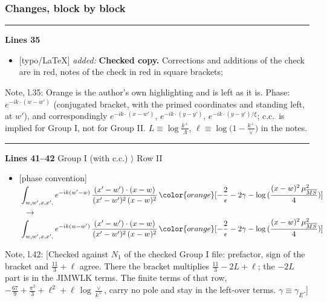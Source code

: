 \documentclass[10pt]{article}
\newenvironment{notebox}{\def\FrameCommand{{\color{notebar}\vrule width 1.5pt}\hspace{6pt}}\MakeFramed{\advance\hsize-\width\FrameRestore}\small}{\endMakeFramed}
\begin{document}
\subsubsection*{Changes, block by block}
\noindent\rule{\linewidth}{0.3pt}\par\noindent\textbf{Lines 35}\par
\begin{itemize}[leftmargin=2.2em,itemsep=1pt,topsep=2pt]
\item[\textbf{l.35}] \textsf{\small [typo/LaTeX]} \emph{added:} \textbf{Checked copy.} Corrections and additions of the check are in red, notes of the check in red in square brackets;
\end{itemize}
\begin{notebox}\textsf{\small Note, l.35:} Orange is the author's own highlighting and is left as it is. Phase: $e^{-ik\cdot(w-w')}$ (conjugated bracket, with the primed coordinates and standing left, at $w'$), and correspondingly $e^{-ik\cdot(x-w')}$, $e^{-ik\cdot(y-y')}$, $e^{-ik\cdot(y-y')/\xi}$; c.c.\ is implied for Group I, not for Group II. $L\equiv\log\frac{k^{+}}{\Lambda}$, $\ell\equiv\log\big(1-\frac{k^{+}}{\vee}\big)$ in the notes.\end{notebox}
\noindent\rule{\linewidth}{0.3pt}\par\noindent\textbf{Lines 41--42} \quad \textsf{Group I (with c.c.) $\rangle$ Row II} \par
\begin{itemize}[leftmargin=2.2em,itemsep=1pt,topsep=2pt]
\item[\textbf{l.41}] \textsf{\small [phase convention]} $\displaystyle \, \int_{w, w',x,x',} e^{-ik(w^\prime-w)}\, \frac{(x'-w')\cdot (x-w)}{(x'-w')^{2}\, (x-w)^{2}}\, {\color{orange}[-\frac{2}{\epsilon}-2\gamma-\log{(\frac{(x-w)^{2}\,\mu^{2}_{\overline{MS}}}{4})}]}$\ $\longrightarrow$\ $\displaystyle \, \int_{w, w',x,x',} e^{-ik(w-w^\prime)}\, \frac{(x'-w')\cdot (x-w)}{(x'-w')^{2}\, (x-w)^{2}}\, {\color{orange}[-\frac{2}{\epsilon}-2\gamma-\log{(\frac{(x-w)^{2}\,\mu^{2}_{\overline{MS}}}{4})}]}$
\end{itemize}
\begin{notebox}\textsf{\small Note, l.42:} [Checked against $N_{1}$ of the checked Group I file: prefactor, sign of the bracket and $\frac{11}{3}+\ell$ agree. There the bracket multiplies $\frac{11}{3}-2L+\ell$; the $-2L$ part is in the JIMWLK terms. The finite terms of that row, $-\frac{67}{9}+\frac{\pi^{2}}{3}+\ell^{2}+\ell\,\log\frac{\vee}{k^{+}}$, carry no pole and stay in the left-over terms. $\gamma\equiv\gamma_{E}$.]\end{notebox}
\end{document}
